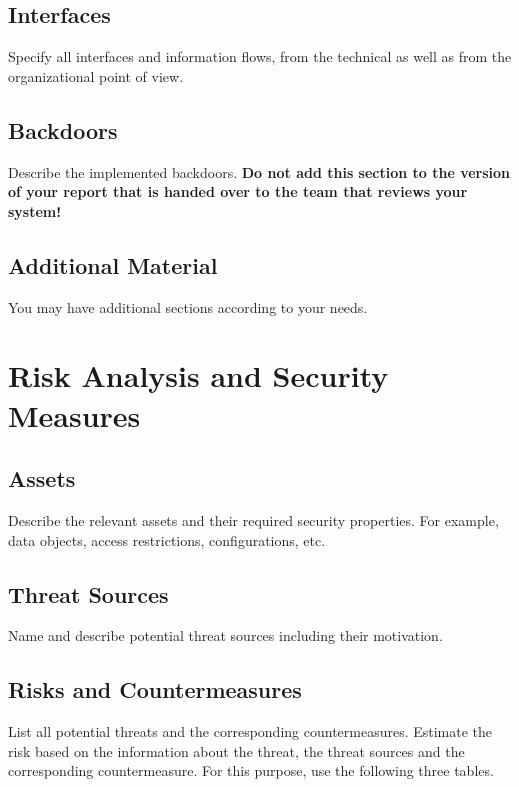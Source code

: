 \documentclass{article}
\begin{document}
\subsection{Interfaces}

Specify  all interfaces and  information flows, from the technical as well as from the
  organizational point of view.

\subsection{Backdoors}

Describe the implemented backdoors. {\bfseries Do not add
    this section to the version of your report that is handed over to
    the team that reviews your system!}

\subsection{Additional Material}

You may have additional sections according to your needs.


\section{Risk Analysis and Security Measures}

\subsection{Assets}

Describe the relevant assets and their required security
  properties. For example, data objects, access restrictions,
  configurations, etc.

\subsection{Threat Sources}

Name and describe potential threat sources including their motivation.

\subsection{Risks and Countermeasures}

List all potential threats and the
  corresponding countermeasures. Estimate the risk based on 
  the information about the threat, the threat sources and the 
  corresponding countermeasure. For this purpose, use the following three
  tables.
\end{document}
